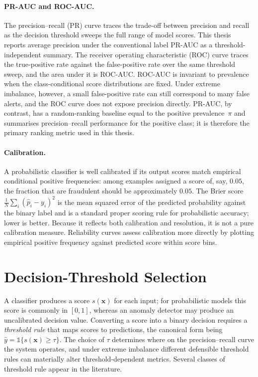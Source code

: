 \paragraph{PR-AUC and ROC-AUC.}
The precision--recall (PR) curve traces the trade-off between precision and
recall as the decision threshold sweeps the full range of model scores.
This thesis reports average precision under the conventional label PR-AUC as a
threshold-independent summary. The receiver operating characteristic (ROC)
curve traces the true-positive rate against the false-positive rate over the
same threshold sweep, and the area under it is ROC-AUC. ROC-AUC is invariant to
prevalence when the class-conditional score distributions are fixed. Under
extreme imbalance, however, a small false-positive rate can still correspond
to many false alerts, and the ROC curve does not expose precision directly.
PR-AUC, by contrast, has a random-ranking baseline equal to the positive
prevalence~$\pi$ and summarises precision--recall performance for the positive
class; it is therefore the primary ranking metric used in this thesis.

\paragraph{Calibration.}
A probabilistic classifier is well calibrated if its output scores match
empirical conditional positive frequencies: among examples assigned a score
of, say, $0.05$, the fraction that are fraudulent should be approximately $0.05$.
The Brier score $\frac{1}{N}\sum_i(\hat{p}_i - y_i)^2$ is the mean squared
error of the predicted probability against the binary label and is a standard
proper scoring rule for probabilistic accuracy; lower is better. Because it
reflects both calibration and resolution, it is not a pure calibration measure.
Reliability curves assess calibration more directly by plotting empirical
positive frequency against predicted score within score bins.

\section{Decision-Threshold Selection}
\label{sec:tb:thresholds}

A classifier produces a score $s(\mathbf{x})$ for each input; for probabilistic
models this score is commonly in $[0,1]$, whereas an anomaly detector may produce
an uncalibrated decision value. Converting a score into a binary decision requires a
\emph{threshold rule} that maps scores to predictions, the canonical form
being $\hat{y} = \mathbb{1}\{s(\mathbf{x}) \geq \tau\}$. The choice of $\tau$
determines where on the precision--recall curve the system operates, and
under extreme imbalance different defensible threshold rules can materially
alter threshold-dependent metrics. Several classes of threshold rule appear
in the literature.


